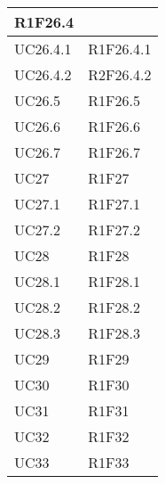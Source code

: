 \begin{center}
\begin{longtable}{|p{44mm}|p{22mm}|}
R1F26.4 \newline
\\
\hline
UC26.4.1 &

R1F26.4.1 \newline
\\
\hline
UC26.4.2 &

R2F26.4.2 \newline
\\
\hline
UC26.5 &

R1F26.5 \newline
\\
\hline
UC26.6 &

R1F26.6 \newline
\\
\hline
UC26.7 &

R1F26.7 \newline
\\
\hline
UC27 &

R1F27 \newline
\\
\hline
UC27.1 &

R1F27.1 \newline
\\
\hline
UC27.2 &

R1F27.2 \newline
\\
\hline
UC28 &

R1F28 \newline
\\
\hline
UC28.1 &

R1F28.1 \newline
\\
\hline
UC28.2 &

R1F28.2 \newline
\\
\hline
UC28.3 &

R1F28.3 \newline
\\
\hline
UC29 &

R1F29 \newline
\\
\hline
UC30 &

R1F30 \newline
\\
\hline
UC31 &

R1F31 \newline
\\
\hline
UC32 &

R1F32 \newline
\\
\hline
UC33 &

R1F33 \newline
\\
\hline%

	\end{longtable}
\end{center}

